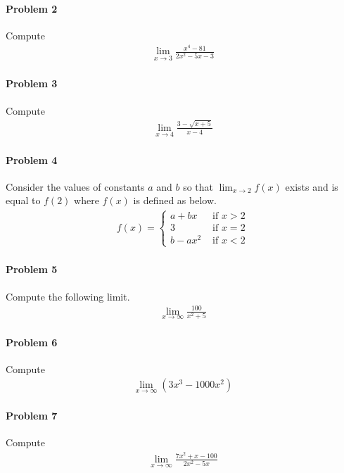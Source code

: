 \documentclass[a4paper, 11pt]{article}
\begin{document}
\paragraph{Problem 2} Compute
\begin{align}
    \lim_{x\rightarrow 3} \frac{x^4 - 81}{2x^2-5x-3}  \nonumber
\end{align}

\paragraph{Problem 3}
Compute
\begin{align}
    \lim_{x\rightarrow 4} \frac{3-\sqrt{x+5}}{x-4}  \nonumber
\end{align}

\paragraph{Problem 4}
Consider the values of constants $a$ and $b$ so that $\lim_{x \rightarrow 2} f(x)$ exists and is equal to $f(2)$ where $f(x)$ is defined as below.
\begin{align}
    f(x) = \begin{cases}
    			a + bx & \text{ if } x > 2 \\
    			3 & \text{ if } x=2 \\
    			b-ax^2 & \text{ if } x < 2
    	   \end{cases}  \nonumber
\end{align}

\paragraph{Problem 5}
Compute the following limit.
\begin{align}
    \lim_{x\rightarrow \infty} \frac{100}{x^2 + 5}  \nonumber
\end{align}


\paragraph{Problem 6}
Compute
\begin{align}
    \lim_{x\rightarrow \infty} (3x^3 - 1000x^2)  \nonumber
\end{align}


\paragraph{Problem 7}
Compute
\begin{align}
    \lim_{x\rightarrow \infty} \frac{7x^2 + x - 100}{2x^2 - 5x}  \nonumber
\end{align}
\end{document}
